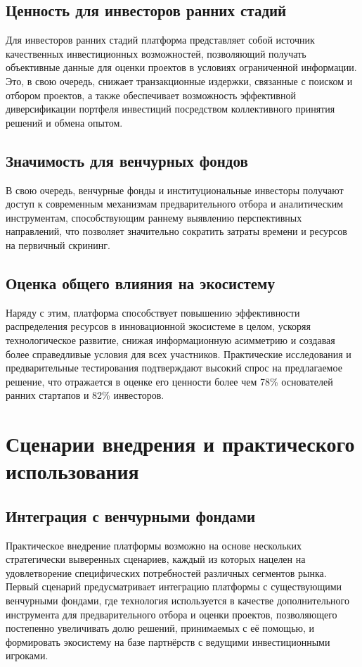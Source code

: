 \documentclass[
    candidate, %
    subf, %
    dotsinheaders=false,
]{disser}
\begin{document}
\subsection{Ценность для инвесторов ранних стадий}
Для инвесторов ранних стадий платформа представляет собой источник качественных инвестиционных возможностей, позволяющий получать объективные данные для оценки проектов в условиях ограниченной информации. Это, в свою очередь, снижает транзакционные издержки, связанные с поиском и отбором проектов, а также обеспечивает возможность эффективной диверсификации портфеля инвестиций посредством коллективного принятия решений и обмена опытом.

\subsection{Значимость для венчурных фондов}
В свою очередь, венчурные фонды и институциональные инвесторы получают доступ к современным механизмам предварительного отбора и аналитическим инструментам, способствующим раннему выявлению перспективных направлений, что позволяет значительно сократить затраты времени и ресурсов на первичный скрининг.

\subsection{Оценка общего влияния на экосистему}
Наряду с этим, платформа способствует повышению эффективности распределения ресурсов в инновационной экосистеме в целом, ускоряя технологическое развитие, снижая информационную асимметрию и создавая более справедливые условия для всех участников. Практические исследования и предварительные тестирования подтверждают высокий спрос на предлагаемое решение, что отражается в оценке его ценности более чем 78\% основателей ранних стартапов и 82\% инвесторов.

\section{Сценарии внедрения и практического использования}

\subsection{Интеграция с венчурными фондами}
Практическое внедрение платформы возможно на основе нескольких стратегически выверенных сценариев, каждый из которых нацелен на удовлетворение специфических потребностей различных сегментов рынка. Первый сценарий предусматривает интеграцию платформы с существующими венчурными фондами, где технология используется в качестве дополнительного инструмента для предварительного отбора и оценки проектов, позволяющего постепенно увеличивать долю решений, принимаемых с её помощью, и формировать экосистему на базе партнёрств с ведущими инвестиционными игроками.
\end{document}
